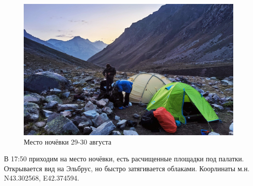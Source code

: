 \begin{figure}[h!]
	\centering
	\includegraphics[width=0.7\linewidth]{../pics/IMG_20240829_191225.jpg}
	\caption{Место ночёвки 29-30 августа}
	\label{fig:IMG_20240829_191225.jpg}
\end{figure}

В 17:50 приходим на место ночёвки, есть расчищенные площадки под палатки. Открывается вид на Эльбрус, но быстро затягивается облаками. Коорлинаты м.н. N43.302568\degree, E42.374594\degree.


\clearpage